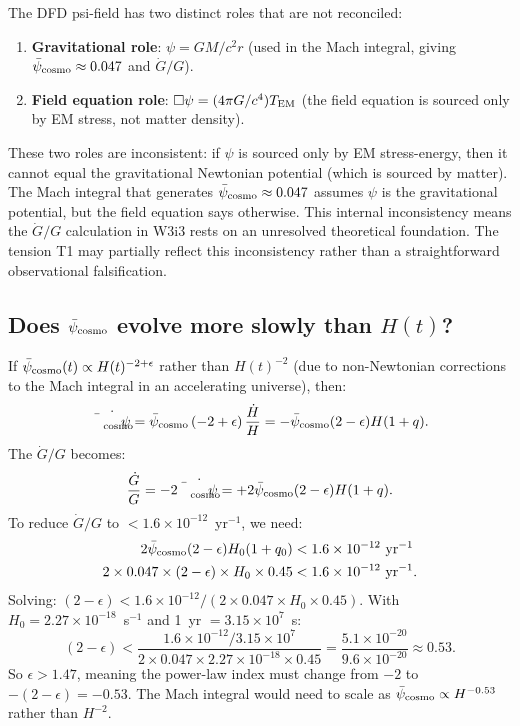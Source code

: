 \documentclass[11pt]{article}
\newcommand{\ee}[1]{\times 10^{#1}}
\newcommand{\psicosmo}{\bar{\psi}_{\rm cosmo}}
\begin{document}
\begin{tcolorbox}[colback=red!5!white, colframe=red!60!black,
  title=\textbf{T2: Internal Inconsistency in the DFD Source Term}]
The DFD psi-field has two distinct roles that are not reconciled:
\begin{enumerate}
\item \textbf{Gravitational role}: $\psi = GM/c^2 r$ (used in the Mach integral,
  giving $\psicosmo \approx 0.047$ and $\dot{G}/G$).
\item \textbf{Field equation role}: $\Box\psi = (4\pi G/c^4) T_{\rm EM}$
  (the field equation is sourced only by EM stress, not matter density).
\end{enumerate}
These two roles are inconsistent: if $\psi$ is sourced only by EM stress-energy,
then it cannot equal the gravitational Newtonian potential (which is sourced
by matter). The Mach integral that generates $\psicosmo \approx 0.047$ assumes
$\psi$ is the gravitational potential, but the field equation says otherwise.
This internal inconsistency means the $\dot{G}/G$ calculation in W3i3 rests on
an unresolved theoretical foundation. The tension T1 may partially reflect
this inconsistency rather than a straightforward observational falsification.
\end{tcolorbox}

\subsection{Does $\psicosmo$ evolve more slowly than $H(t)$?}

If $\psicosmo(t) \propto H(t)^{-2+\epsilon}$ rather than $H(t)^{-2}$ (due to
non-Newtonian corrections to the Mach integral in an accelerating universe),
then:
\begin{equation}
\dot{\psicosmo} = \psicosmo\left(-2+\epsilon\right)\frac{\dot{H}}{H}
= -\psicosmo(2-\epsilon)H(1+q).
\end{equation}
The $\dot{G}/G$ becomes:
\begin{equation}
\frac{\dot{G}}{G} = -2\dot{\psicosmo} = +2\psicosmo(2-\epsilon)H(1+q).
\label{eq:Gdot-epsilon}
\end{equation}
To reduce $\dot{G}/G$ to $< 1.6\ee{-12}$~yr$^{-1}$, we need:
\begin{align}
2\psicosmo(2-\epsilon)H_0(1+q_0) &< 1.6\ee{-12}~\text{yr}^{-1} \notag \\
2\times0.047\times(2-\epsilon)\times H_0\times 0.45 &< 1.6\ee{-12}~\text{yr}^{-1}.
\label{eq:epsilon-bound}
\end{align}
Solving: $(2-\epsilon) < 1.6\ee{-12}/(2\times 0.047 \times H_0 \times 0.45)$.
With $H_0 = 2.27\ee{-18}$~s$^{-1}$ and 1~yr $= 3.15\ee{7}$~s:
\begin{equation}
(2-\epsilon) < \frac{1.6\ee{-12}/3.15\ee{7}}{2\times 0.047\times 2.27\ee{-18}\times 0.45}
= \frac{5.1\ee{-20}}{9.6\ee{-20}} \approx 0.53.
\end{equation}
So $\epsilon > 1.47$, meaning the power-law index must change from $-2$ to
$-(2-\epsilon) = -0.53$. The Mach integral would need to scale as
$\psicosmo \propto H^{-0.53}$ rather than $H^{-2}$.
\end{document}
